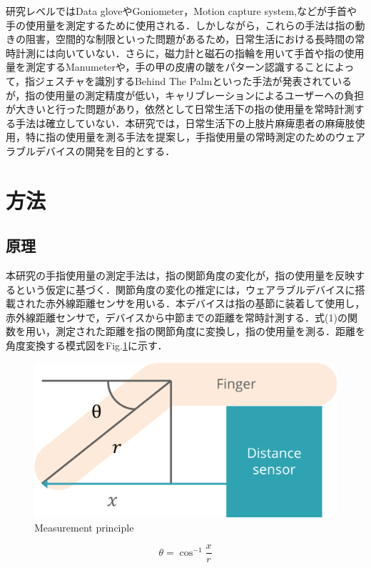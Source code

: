 \documentclass{jarticle}
\begin{document}
研究レベルではData gloveやGoniometer，Motion capture system\cite{Binh2014},\cite{Valtin2017}などが手首や手の使用量を測定するために使用される．しかしながら，これらの手法は指の動きの阻害，空間的な制限といった問題があるため，日常生活における長時間の常時計測には向いていない．さらに，磁力計と磁石の指輪を用いて手首や指の使用量を測定するManumeter\cite{Friedman2014}や，手の甲の皮膚の皺をパターン認識することによって，指ジェスチャを識別するBehind The Palm\cite{Recognition2017}といった手法が発表されているが，指の使用量の測定精度が低い，キャリブレーションによるユーザーへの負担が大きいと行った問題があり，依然として日常生活下の指の使用量を常時計測する手法は確立していない．本研究では，日常生活下の上肢片麻痺患者の麻痺肢使用，特に指の使用量を測る手法を提案し，手指使用量の常時測定のためのウェアラブルデバイスの開発を目的とする．


\section{方法}
\subsection{原理}
本研究の手指使用量の測定手法は，指の関節角度の変化が，指の使用量を反映するという仮定に基づく．関節角度の変化の推定には，ウェアラブルデバイスに搭載された赤外線距離センサを用いる．本デバイスは指の基節に装着して使用し，赤外線距離センサで，デバイスから中節までの距離を常時計測する．式(1)の関数を用い，測定された距離を指の関節角度に変換し，指の使用量を測る．距離を角度変換する模式図をFig.\ref{fig:principle}に示す．


\begin{figure}[h]
  \centering
  \includegraphics[width=0.8\linewidth]{fig/principle}
  \caption{Measurement principle}
  \label{fig:principle}
\end{figure}

\begin{equation}
\theta = \cos^{-1} \frac{x}{r}
\end{equation}
\end{document}

